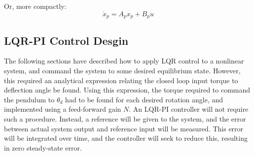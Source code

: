 Or, more compactly:
\begin{equation*}
  \dot{x}_{p}=A_{p}x_{p}+B_{p}u
\end{equation*}

\subsection{LQR-PI Control Desgin}

The following sections have described how to apply LQR control to a nonlinear system, and command the system to some desired equilibrium state.
However, this required an analytical expression relating the closed loop input torque to deflection angle be found.
Using this expression, the torque required to command the pendulum to $\theta_d$ had to be found for each desired rotation angle, and implemented using a feed-forward gain $N$.
An LQR-PI controller will not require such a procedure.
Instead, a reference will be given to the system, and the error between actual system output and reference input will be measured.
This error will be integrated over time, and the controller will seek to reduce this, resulting in zero steady-state error.

